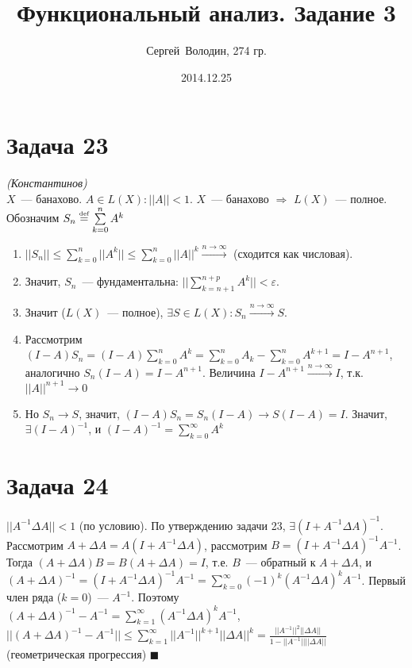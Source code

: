 \documentclass[a4paper]{article}
\date{2014.12.25}
\author{Сергей~Володин, 274 гр.}
\title{Функциональный анализ. Задание 3}
\def\eps{\varepsilon}
\def\eqdef{\overset{\mbox{\tiny def}}{=}}
\begin{document}
\maketitle
\section*{Задача 23}
{\em (Константинов)}\\
$X$~--- банахово. $A\in L(X)\colon ||A|| < 1$. $X$~--- банахово $\Rightarrow$ $L(X)$~--- полное. Обозначим $S_n\eqdef\sum\limits_{k=0}^n A^k$
\begin{enumerate}
\item $||S_n||\leqslant\sum\limits_{k=0}^n ||A^k||\leqslant\sum\limits_{k=0}^n||A||^k\overset{n\to\infty}{\to}$ (сходится как числовая). %
\item Значит, $S_n$~--- фундаментальна: $||\sum\limits_{k=n+1}^{n+p}A^k||<\eps$.
\item Значит ($L(X)$~--- полное), $\exists S\in L(X)\colon S_n\overset{n\to\infty}{\to}S$.
\item Рассмотрим $(I-A)S_n=(I-A)\sum\limits_{k=0}^n A^k=\sum\limits_{k=0}^n A_k-\sum\limits_{k=0}^n A^{k+1}=I-A^{n+1}$, аналогично $S_n(I-A)=I-A^{n+1}$. Величина $I-A^{n+1}\overset{n\to\infty}{\to}I$, т.к. $||A||^{n+1}\to 0$
\item Но $S_n\to S$, значит, $(I-A)S_n=S_n(I-A)\to S(I-A)=I$. Значит, $\exists (I-A)^{-1}$, и $(I-A)^{-1}=\sum\limits_{k=0}^\infty A^k$
\end{enumerate}	
\section*{Задача 24}
$||A^{-1}\Delta A||<1$ (по условию). По утверждению задачи 23, $\exists (I+A^{-1}\Delta A)^{-1}$. Рассмотрим $A+\Delta A=A(I+A^{-1}\Delta A)$, рассмотрим $B=(I+A^{-1}\Delta A)^{-1}A^{-1}$. Тогда $(A+\Delta A)B=B(A+\Delta A)=I$, т.е. $B$~--- обратный к $A+\Delta A$, и $(A+\Delta A)^{-1}=(I+A^{-1}\Delta A)^{-1}A^{-1}=\sum\limits_{k=0}^\infty (-1)^k(A^{-1}\Delta A)^k A^{-1}$. Первый член ряда ($k=0$)~--- $A^{-1}$. Поэтому $(A+\Delta A)^{-1}-A^{-1}=\sum\limits_{k=1}^\infty (A^{-1}\Delta A)^kA^{-1}$, $||(A+\Delta A)^{-1}-A^{-1}||\leqslant\sum\limits_{k=1}^\infty ||A^{-1}||^{k+1}||\Delta A||^k=\frac{||A^{-1}||^2||\Delta A||}{1-||A^{-1}||||\Delta A||}$ (геометрическая прогрессия) $\blacksquare$
\end{document}
